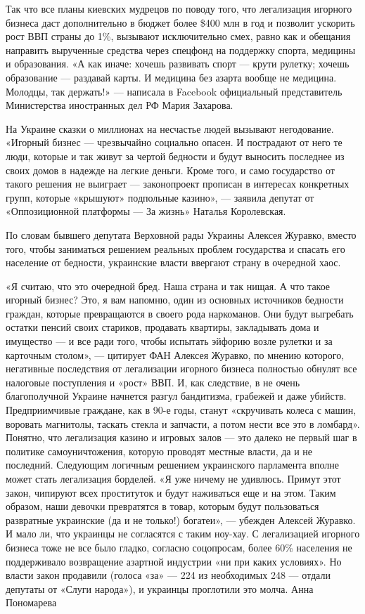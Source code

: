 Так что все планы киевских мудрецов по поводу того, что легализация игорного
бизнеса даст дополнительно в бюджет более \$400 млн в год и позволит ускорить
рост ВВП страны до 1\%, вызывают исключительно смех, равно как и обещания
направить вырученные средства через спецфонд на поддержку спорта, медицины и
образования. «А как иначе: хочешь развивать спорт — крути рулетку; хочешь
образование — раздавай карты. И медицина без азарта вообще не медицина.
Молодцы, так держать!» — написала в Facebook официальный представитель
Министерства иностранных дел РФ Мария Захарова.

На Украине сказки о миллионах на несчастье людей вызывают негодование. «Игорный
бизнес — чрезвычайно социально опасен. И пострадают от него те люди, которые и
так живут за чертой бедности и будут выносить последнее из своих домов в
надежде на легкие деньги. Кроме того, и само государство от такого решения не
выиграет — законопроект прописан в интересах конкретных групп, которые
«крышуют» подпольные казино», — заявила депутат от «Оппозиционной платформы —
За жизнь» Наталья Королевская.

По словам бывшего депутата Верховной рады Украины Алексея Журавко, вместо того,
чтобы заниматься решением реальных проблем государства и спасать его население
от бедности, украинские власти ввергают страну в очередной хаос.

«Я считаю, что это очередной бред. Наша страна и так нищая. А что такое игорный
бизнес? Это, я вам напомню, один из основных источников бедности граждан,
которые превращаются в своего рода наркоманов. Они будут выгребать остатки
пенсий своих стариков, продавать квартиры, закладывать дома и имущество — и все
ради того, чтобы испытать эйфорию возле рулетки и за карточным столом», —
цитирует ФАН Алексея Журавко, по мнению которого, негативные последствия от
легализации игорного бизнеса полностью обнулят все налоговые поступления и
«рост» ВВП. И, как следствие, в не очень благополучной Украине начнется разгул
бандитизма, грабежей и даже убийств. Предприимчивые граждане, как в 90-е годы,
станут «скручивать колеса с машин, воровать магнитолы, таскать стекла и
запчасти, а потом нести все это в ломбард».  Понятно, что легализация казино и
игровых залов — это далеко не первый шаг в политике самоуничтожения, которую
проводят местные власти, да и не последний. Следующим логичным решением
украинского парламента вполне может стать легализация борделей. «Я уже ничему
не удивлюсь. Примут этот закон, чипируют всех проституток и будут наживаться
еще и на этом. Таким образом, наши девочки превратятся в товар, которым будут
пользоваться развратные украинские (да и не только!) богатеи», — убежден
Алексей Журавко.  И мало ли, что украинцы не согласятся с таким ноу-хау. С
легализацией игорного бизнеса тоже не все было гладко, согласно соцопросам,
более 60\% населения не поддерживало возвращение азартной индустрии «ни при
каких условиях». Но власти закон продавили (голоса «за» — 224 из необходимых
248 — отдали депутаты от «Слуги народа»), и украинцы проглотили это молча.
Анна Пономарева
